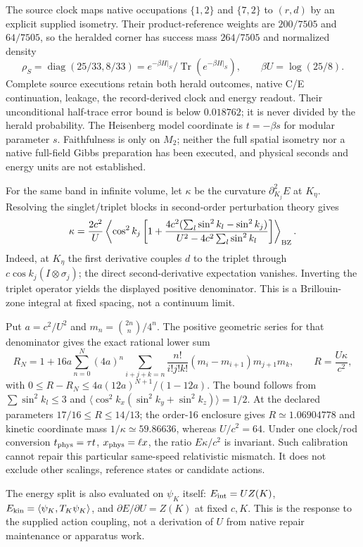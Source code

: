 The source clock maps native occupations $\{1,2\}$ and $\{7,2\}$ to
$(r,d)$ by an explicit supplied isometry. Their product-reference weights
are $200/7505$ and $64/7505$, so the heralded corner has success mass
$264/7505$ and normalized density
\[
 \rho_S=\operatorname{diag}(25/33,8/33)
       =e^{-\beta H|_S}/\operatorname{Tr}(e^{-\beta H|_S}),
 \qquad \beta U=\log(25/8).
\]
Complete source executions retain both herald outcomes, native C/E
continuation, leakage, the record-derived clock and energy readout. Their
unconditional half-trace error bound is below $0.018762$; it is never
divided by the herald probability. The Heisenberg model coordinate is
$t=-\beta s$ for modular parameter $s$. Faithfulness is only on $M_2$;
neither the full spatial isometry nor a native full-field Gibbs preparation
has been executed, and physical seconds and energy units are not established.

For the same band in infinite volume, let $\kappa$ be the curvature
$\partial_{K_j}^2E$ at $K_\eta$. Resolving the singlet/triplet blocks in
second-order perturbation theory gives
\[
 \kappa=\frac{2c^2}{U}\left\langle \cos^2 k_j
 \left[1+\frac{4c^2(\sum_l\sin^2 k_l-\sin^2 k_j)}
                   {U^2-4c^2\sum_l\sin^2 k_l}\right]\right\rangle_{\rm BZ}.
\]
Indeed, at $K_\eta$ the first derivative couples $d$ to the triplet through
$c\cos k_j(I\otimes\sigma_j)$; the direct second-derivative expectation vanishes.
Inverting the triplet operator yields the displayed positive denominator.
This is a Brillouin-zone integral at fixed spacing, not a continuum limit.

Put $a=c^2/U^2$ and $m_n=\binom{2n}{n}/4^n$. The positive geometric
series for that denominator gives the exact rational lower sum
\[
 R_N=1+16a\sum_{n=0}^N(4a)^n
   \sum_{i+j+k=n}\frac{n!}{i!j!k!}(m_i-m_{i+1})m_{j+1}m_k,
 \qquad R=\frac{U\kappa}{c^2},
\]
with $0\le R-R_N\le4a(12a)^{N+1}/(1-12a)$. The bound follows from
$\sum\sin^2 k_l\le3$ and
$\langle\cos^2 k_x(\sin^2 k_y+\sin^2 k_z)\rangle=1/2$.
At the declared parameters $17/16\le R\le14/13$; the
order-16 enclosure gives $R\simeq1.06904778$ and kinetic coordinate mass
$1/\kappa\simeq59.86636$, whereas $U/c^2=64$.
Under one clock/rod conversion $t_{\rm phys}=\tau t$,
$x_{\rm phys}=\ell x$, the ratio $E\kappa/c^2$ is invariant. Such
calibration cannot repair this particular same-speed relativistic mismatch.
It does not exclude other scalings, reference states or candidate actions.

The energy split is also evaluated on $\psi_K$ itself:
$E_{\rm int}=UZ(K)$, $E_{\rm kin}=\langle\psi_K,T_K\psi_K\rangle$,
and $\partial E/\partial U=Z(K)$ at fixed $c,K$. This is the response to
the supplied action coupling, not a derivation of $U$ from native repair
maintenance or apparatus work.

